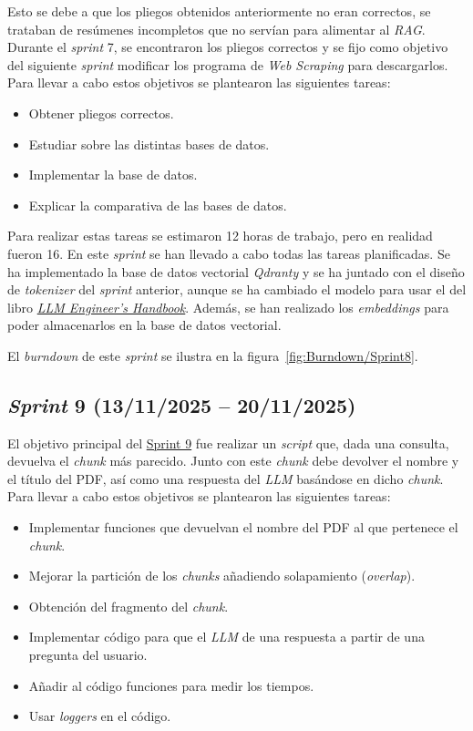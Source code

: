 Esto se debe a que los pliegos obtenidos anteriormente no eran correctos, se trataban de resúmenes incompletos que no servían para alimentar al \textit{RAG}. Durante el \textit{sprint} 7, se encontraron los pliegos correctos y se fijo como objetivo del siguiente \textit{sprint} modificar los programa de \textit{Web Scraping} para descargarlos. 
Para llevar a cabo estos objetivos se plantearon las siguientes tareas:
\begin{itemize}
\tightlist
	\item Obtener pliegos correctos.
	\item Estudiar sobre las distintas bases de datos.
	\item Implementar la base de datos.
	\item Explicar la comparativa de las bases de datos.
\end{itemize}

Para realizar estas tareas se estimaron 12 horas de trabajo, pero en realidad fueron 16. En este \textit{sprint} se han llevado a cabo todas las tareas planificadas. Se ha implementado la base de datos vectorial \textit{Qdranty} y se ha juntado con el diseño de \textit{tokenizer} del \textit{sprint} anterior, aunque se ha cambiado el modelo para usar el del libro \href{https://www.amazon.com/LLM-Engineers-Handbook-engineering-production/dp/1836200072}{\textit{LLM Engineer's Handbook}}. Además, se han realizado los \textit{embeddings} para poder almacenarlos en la base de datos vectorial.

El \textit{burndown} de este \textit{sprint} se ilustra en la figura~\ref{fig:Burndown/Sprint8}.

\subsection{\textit{Sprint} 9 (13/11/2025 -- 20/11/2025)}
El objetivo principal del \href{https://github.com/lbr1014/TFG_RAG/milestone/9?closed=1}{Sprint 9} fue realizar un \textit{script} que, dada una consulta, devuelva el \textit{chunk} más parecido. Junto con este \textit{chunk} debe devolver el nombre y el título del PDF, así como una respuesta del \textit{LLM} basándose en dicho \textit{chunk}. Para llevar a cabo estos objetivos se plantearon las siguientes tareas:
\begin{itemize}
\tightlist
	\item Implementar funciones que devuelvan el nombre del PDF al que pertenece el \textit{chunk}.
	\item Mejorar la partición de los \textit{chunks} añadiendo solapamiento (\textit{overlap}).
	\item Obtención del fragmento del \textit{chunk}.
	\item Implementar código para que el \textit{LLM} de una respuesta a partir de una pregunta del usuario.
	\item Añadir al código funciones para medir los tiempos.
	\item Usar \textit{loggers} en el código.
\end{itemize}

